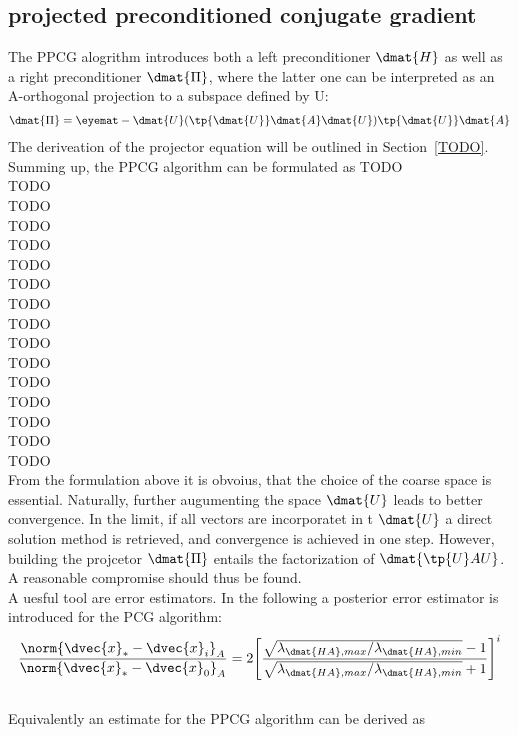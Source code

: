 \subsection{projected preconditioned conjugate gradient}
The PPCG alogrithm introduces both a left preconditioner $\dmat{H}$ as well as a right preconditioner $\dmat{\Pi}$, where the latter one can be interpreted as an A-orthogonal projection to a subspace defined by U:
\begin{align}
\dmat{\Pi}=\eyemat-\dmat{U}(\tp{\dmat{U}}\dmat{A}\dmat{U}  )\tp{\dmat{U}}\dmat{A}
\end{align}
The deriveation of the projector equation will be outlined in Section~\ref{TODO}.\\
Summing up, the PPCG algorithm can be formulated as
TODO\\
TODO\\
TODO\\
TODO\\
TODO\\
TODO\\
TODO\\
TODO\\
TODO\\
TODO\\
TODO\\
TODO\\
TODO\\
TODO\\
TODO\\
TODO\\
From the formulation above it is obvoius, that the choice of the coarse space is essential. Naturally, further augumenting the space $\dmat{U}$ leads to better convergence. In the limit, if all vectors are incorporatet in t $\dmat{U}$ a direct solution method is retrieved, and convergence is achieved in one step. However, building the projcetor $\dmat{\Pi}$ entails the factorization of $\dmat{\tp{U} A U}$. A reasonable compromise should thus be found.\\
A uesful tool are error estimators. In \cite{Kaniel1966} the following a posterior error estimator is introduced for the PCG algorithm:
\begin{align}
\frac{\norm{\dvec{x}_*-\dvec{x}_i   }_A}{\norm{\dvec{x}_*-\dvec{x}_0}_A} =
2 \Bigg [ \frac{ \sqrt{\lambda_{\dmat{H A},max}/\lambda_{\dmat{H A},min}}-1 }{ \sqrt{\lambda_{\dmat{H A},max}/\lambda_{\dmat{H A},min}}+1 } \Bigg ]^i
\end{align}
\\
Equivalently an estimate for the PPCG algorithm can be derived as


